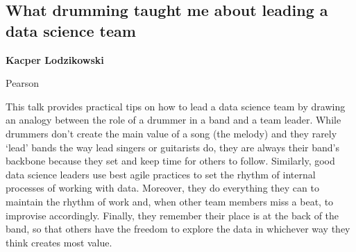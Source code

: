 \documentclass[\main/boa.tex]{subfiles}
\begin{document}
\subsection{What drumming taught me about leading a data science team}

\begin{minipage}{0.915\textwidth}
	\centering
  {\bf {} Kacper Lodzikowski}
\end{minipage}



\begin{affiliations}
\begin{minipage}{0.915\textwidth}
\centering
Pearson  \\[-2pt]
\end{minipage}
\end{affiliations}

\vskip 0.3cm

 This talk provides practical tips on how to lead a data science team by drawing an analogy between the role of a drummer in a band and a team leader. While drummers don’t create the main value of a song (the melody) and they rarely ‘lead’ bands the way lead singers or guitarists do, they are always their band’s backbone because they set and keep time for others to follow. Similarly, good data science leaders use best agile practices to set the rhythm of internal processes of working with data. Moreover, they do everything they can to maintain the rhythm of work and, when other team members miss a beat, to improvise accordingly. Finally, they remember their place is at the back of the band, so that others have the freedom to explore the data in whichever way they think creates most value. 
\end{document}
